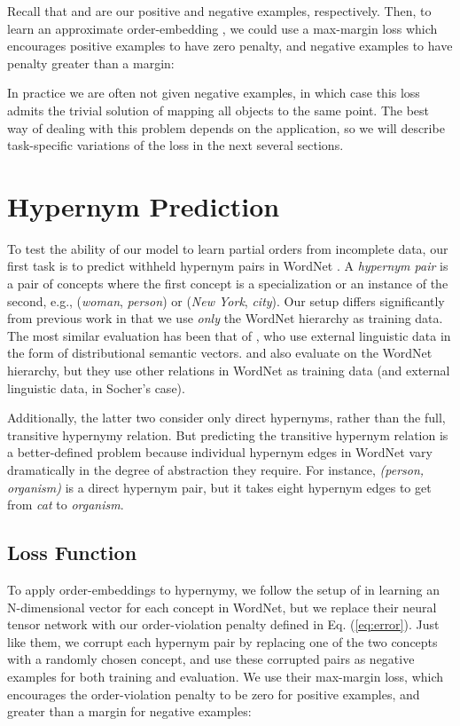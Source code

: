 \documentclass{article} \usepackage{iclr2016_conference,times}
\begin{document}
Recall that  and  are our positive and negative examples, respectively. Then, to learn an approximate order-embedding , we could use a max-margin loss which encourages positive examples to have zero penalty, and negative examples to have penalty greater than a margin:

In practice we are often not given negative examples, in which case this loss admits the trivial solution of mapping all objects to the same point. The best way of dealing with this problem depends on the application, so we will describe task-specific variations of the loss in the next several sections. %
 
\section{Hypernym Prediction}
\label{hypernyms}

To test the ability of our model to learn partial orders from incomplete data,  our first task is to predict withheld hypernym pairs in WordNet \citep{miller1995wordnet}. A {\it hypernym pair} is a pair of concepts  where the first concept is a specialization or an  instance of the second, e.g., (\emph{woman}, \emph{person}) or (\emph{New York}, \emph{city}).
 Our setup differs significantly from previous work in that we use \emph{only} the WordNet hierarchy as training data. The most similar evaluation has been that of \citet{baroni2012entailment}, who use external linguistic data in the form of distributional semantic vectors. \citet{bordes2011learning} and \citet{socher2013reasoning} also evaluate on the WordNet hierarchy, but they use other relations in WordNet as training data  (and external linguistic data, in Socher's case). 
 
 Additionally, the latter two consider only direct hypernyms, rather than the full, transitive hypernymy relation. But predicting the transitive hypernym relation is a better-defined problem because individual hypernym edges in WordNet vary dramatically in the degree of abstraction they require. For instance, \emph{(person, organism)} is a direct hypernym pair, but it takes eight hypernym edges to get from \emph{cat} to \emph{organism}.

\subsection{Loss Function}
\vspace{-0.5mm}

To apply  order-embeddings  to hypernymy, we follow the setup of \citet{socher2013reasoning} in learning an N-dimensional vector for each concept in WordNet, but  we replace their neural tensor network with our order-violation penalty defined in Eq. (\ref{eq:error}).
Just like them, we corrupt each hypernym pair by replacing one of the two concepts with a randomly chosen concept, and use these corrupted pairs as negative examples for both training and evaluation. We use their max-margin loss, which encourages the order-violation penalty to be zero for positive examples, and greater than a margin  for negative examples:
\end{document}
